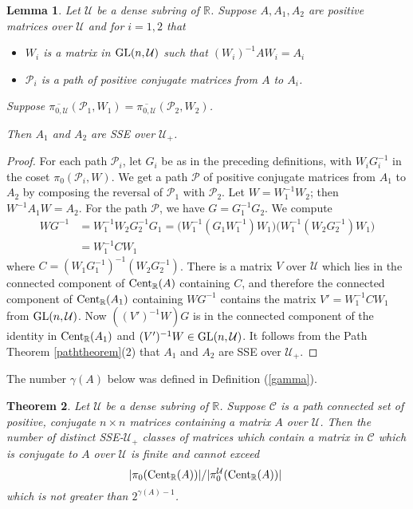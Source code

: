 \documentclass{amsart}
\newtheorem{theorem}{Theorem}[section]
\newtheorem{lemma}[theorem]{Lemma}
\theoremstyle{definition}
\theoremstyle{remark}
\numberwithin{equation}{section}
\begin{document}
{{\begin{lemma} 
Let $\mathcal U$ be a dense subring of $\mathbb R$. 
Suppose $A,A_1,A_2$ are positive matrices over 
$\mathcal U$ and for $i=1,2$ that 
\begin{itemize}
\item
  $W_i$  is a matrix in $  
\textnormal{GL}(n,\mathcal U)$ such that  
$(W_i)^{-1}AW_i=A_i$ 
\item 
$\mathcal P_i$ is a path of positive conjugate 
matrices from $A$ to $A_i$. 
\end{itemize}
Suppose 
$\overline{\pi_{0,\mathcal U}}(\mathcal P_1,W_1)=
\overline{\pi_{0,\mathcal U}}(\mathcal P_2,W_2)$. 

Then $A_1$ and $A_2$ are SSE over $\mathcal U_+$. 
\end{lemma}

\begin{proof} 
For each path $\mathcal P_i$, 
let $G_i$ be as  in the preceding definitions, 
with $W_iG_i^{-1}$ in the coset 
$\pi_0(\mathcal P_i,W)$.
We get a path 
$\mathcal P$ of positive conjugate matrices from 
$A_1$ to $A_2$ by composing the reversal of $\mathcal P_1$ 
with  $\mathcal P_2$. Let $W=W_1^{-1}W_2$; then 
$W^{-1}A_1W=A_2$.
For the path 
$\mathcal P$,  we  have  $G=G_1^{-1}G_2$. 
We compute 
\begin{align*} 
WG^{-1} &= W_1^{-1}W_2G_2^{-1}G_1 
 = \Big( W_1^{-1}
  (G_1W_1^{-1}) 
  W_1\Big)  
\Big(
W_1^{-1}(W_2G_2^{-1}) 
  W_1\Big)  
\\
&
= W_1^{-1}C  
  W_1
\end{align*}
where $C=
  (W_1G_1^{-1})^{-1} 
(W_2G_2^{-1})$. 
There is a matrix $V$ over $\mathcal U$ 
which lies in the connected component of 
${\textnormal{Cent}_{\mathbb R}(A)}$ containing $C$, and therefore 
the connected component of 
$ \textnormal{Cent}_{\mathbb R} (A_{1}) $
containing  
$WG^{-1}$ contains the matrix 
$V'=W_1^{-1}C  
  W_1$ from 
$\textnormal{GL}(n,\mathcal U)$. 
Now $((V')^{-1}W)G$ is in the connected component of the 
identity 
in $ \textnormal{Cent}_{\mathbb R} (A_{1}) $
and 
$(V')^{-1}W\in \textnormal{GL}(n,\mathcal U)$. 
It follows from 
the Path Theorem \ref{paththeorem}(2) that $A_1$ and $A_2$ 
are SSE over $\mathcal U_+$.
\end{proof}

 The number 
$\gamma (A)$ below was defined in Definition (\ref{gamma}). 

\begin{theorem} \label{finitesseforu}
Let $\mathcal U$ be a dense subring of $\mathbb R$. 
Suppose 
$\mathcal C$ is a path connected set of positive, 
conjugate  $n\times n$ matrices containing a matrix $A$ 
over $\mathcal U$. 
Then the number of distinct SSE-$\mathcal U_+$ classes 
of matrices which contain a matrix in $\mathcal C$ 
which is conjugate to $A$ over $\mathcal U$  is finite and cannot exceed 
\[
|\pi_0({\textnormal{Cent}_{\mathbb R}(A)})|/|\pi_0^{\mathcal U}({\textnormal{Cent}_{\mathbb R}(A)})|\ 
\]
which is not greater than $2^{\gamma(A)-1}$.
 

\end{theorem}}}
\end{document}

